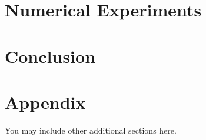 \documentclass{article} %
\begin{document}
\section{Numerical Experiments}
\section{Conclusion}

\newpage




\newpage
\appendix
\section{Appendix}
You may include other additional sections here. 
\end{document}
